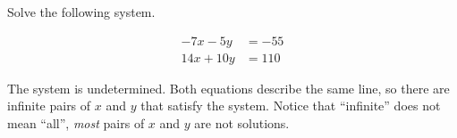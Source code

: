 
\begin{question}
Solve the following system.

\[\begin{aligned}
- 7 x - 5 y&=-55\\
14 x + 10 y&=110
\end{aligned}\]
\end{question}

\begin{solution}
The system is undetermined. Both equations describe the same line, so
there are infinite pairs of \(x\) and \(y\) that satisfy the system.
Notice that ``infinite'' does not mean ``all'', \emph{most} pairs of
\(x\) and \(y\) are not solutions.
\end{solution}

